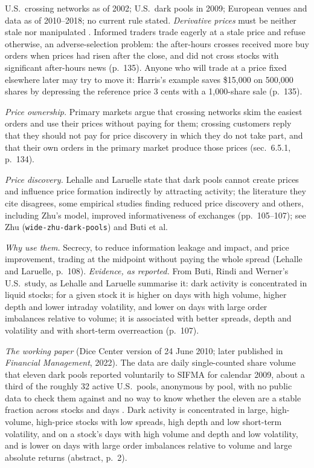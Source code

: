 \begin{qfdefinition}
 U.S.\ crossing networks as of 2002; U.S.\ dark pools in 2009; European venues and data as of 2010--2018; no current rule stated. \emph{Derivative prices} must be neither stale nor manipulated \citep[chap.~6, sec.~6.5.2, pp.~134--136]{alpha-harris}. Informed traders trade eagerly at a stale price and refuse otherwise, an adverse-selection problem: the after-hours crosses received more buy orders when prices had risen after the close, and did not cross stocks with significant after-hours news (p.~135). Anyone who will trade at a price fixed elsewhere later may try to move it: Harris's example saves \$15{,}000 on 500{,}000 shares by depressing the reference price 3 cents with a 1{,}000-share sale (p.~135).

\emph{Price ownership.} Primary markets argue that crossing networks skim the easiest orders and use their prices without paying for them; crossing customers reply that they should not pay for price discovery in which they do not take part, and that their own orders in the primary market produce those prices (sec.~6.5.1, p.~134).

\emph{Price discovery.} Lehalle and Laruelle state that dark pools cannot create prices and influence price formation indirectly by attracting activity; the literature they cite disagrees, some empirical studies finding reduced price discovery and others, including Zhu's model, improved informativeness of exchanges (pp.~105--107); see Zhu (\nolinkurl{wide-zhu-dark-pools}) and Buti et al.

 \emph{Why use them.} Secrecy, to reduce information leakage and impact, and price improvement, trading at the midpoint without paying the whole spread (Lehalle and Laruelle, p.~108). \emph{Evidence, as reported.} From Buti, Rindi and Werner's U.S.\ study, as Lehalle and Laruelle summarise it: dark activity is concentrated in liquid stocks; for a given stock it is higher on days with high volume, higher depth and lower intraday volatility, and lower on days with large order imbalances relative to volume; it is associated with better spreads, depth and volatility and with short-term overreaction (p.~107).

\emph{The working paper} (Dice Center version of 24 June 2010; later published in \emph{Financial Management}, 2022). The data are daily single-counted share volume that eleven dark pools reported voluntarily to SIFMA for calendar 2009, about a third of the roughly 32 active U.S.\ pools, anonymous by pool, with no public data to check them against and no way to know whether the eleven are a stable fraction across stocks and days \citep[pp.~5--6]{brw-2010}. Dark activity is concentrated in large, high-volume, high-price stocks with low spreads, high depth and low short-term volatility, and on a stock's days with high volume and depth and low volatility, and is lower on days with large order imbalances relative to volume and large absolute returns (abstract, p.~2).


\end{qfdefinition}
